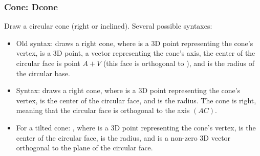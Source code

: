 \subsubsection{Cone: Dcone}

Draw a circular cone (right or inclined). Several possible syntaxes:
\begin{itemize}
    \item Old syntax:  draws a right cone, where  is a 3D point representing the cone's vertex,  is a 3D point, a vector representing the cone's axis, the center of the circular face is point $A+V$ (this face is orthogonal to ), and  is the radius of the circular base.

    \item Syntax:  draws a right cone, where  is a 3D point representing the cone's vertex,  is the center of the circular face, and  is the radius. The cone is right, meaning that the circular face is orthogonal to the axis $(AC)$.

    \item For a tilted cone: , where  is a 3D point representing the cone's vertex,  is the center of the circular face,  is the radius, and  is a non-zero 3D vector orthogonal to the plane of the circular face.
\end{itemize}

